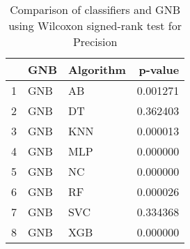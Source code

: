 \begin{table}
\footnotesize
\caption{Comparison of classifiers and GNB using Wilcoxon signed-rank test for Precision}
\label{tab:GNB wilcoxon Precision comparison}
\begin{tabular}{lllr}
\hline
 & GNB & Algorithm & p-value \\
\hline
1 & GNB & AB & 0.001271 \\
2 & GNB & DT & 0.362403 \\
3 & GNB & KNN & 0.000013 \\
4 & GNB & MLP & 0.000000 \\
5 & GNB & NC & 0.000000 \\
6 & GNB & RF & 0.000026 \\
7 & GNB & SVC & 0.334368 \\
8 & GNB & XGB & 0.000000 \\
\hline
\end{tabular}
\end{table}
